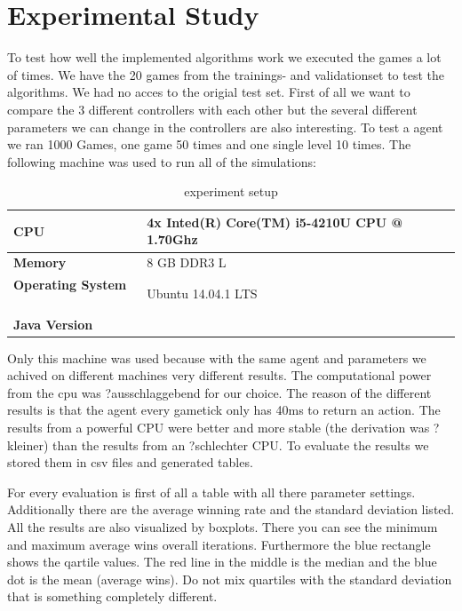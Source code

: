 
\section{Experimental Study} 
\label{sec:exp}


To test how well the implemented algorithms work we executed the games a lot of times. We have the 20 games from the trainings- and validationset to test the algorithms. We had no acces to the origial test set. First of all we want to compare the 3 different controllers with each other but the several different parameters we can change in the controllers are also interesting.
To test a agent we ran 1000 Games, one game 50 times and one single level 10 times. The following machine was used to run all of the simulations:

\begin{table}
\center
\begin{tabular}{ll} 
\textbf{CPU} & 4x Inted(R) Core(TM) i5-4210U CPU @ 1.70Ghz \\ \hline
\textbf{Memory} & 8 GB DDR3 L \\  \hline
\textbf{Operating System} \mbox{   } & Ubuntu 14.04.1 LTS \\  \hline
\textbf{Java Version} &  \\  
\end{tabular}
\caption{experiment setup}
\end{table}


Only this machine was used because with the same agent and parameters we achived on different machines very different results. The computational power from the cpu was ?ausschlaggebend for our choice. The reason of the different results is that the agent every gametick only has 40ms to return an action. The results from a powerful CPU were better and more stable (the derivation was ?kleiner) than the results from an ?schlechter CPU. To evaluate the results we stored them in csv files and generated tables.

For every evaluation is first of all a table with all there parameter settings. Additionally there are the average winning rate and the standard deviation listed.
All the results are also visualized by boxplots. There you can see the minimum and maximum average wins overall iterations. Furthermore the blue rectangle shows 
the qartile values. The red line in the middle is the median and the blue dot is the mean (average wins).
Do not mix quartiles with the standard deviation that is something completely different.

